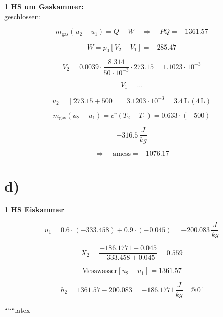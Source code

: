 \textbf{1 HS um Gaskammer:} \\
geschlossen:

\[
m_{\text{gas}} (u_2 - u_1) = Q - W \quad \Rightarrow \quad PQ = -1361.57
\]

\[
W = p_0 \left[ V_2 - V_1 \right] = -285.47
\]

\[
V_2 = 0.0039 \cdot \frac{8.314}{50 \cdot 10^{-3}} \cdot 273.15 = 1.1023 \cdot 10^{-3}
\]

\[
V_1 = \ldots
\]

\[
u_2 = \left[ 273.15 + 500 \right] = 3.1203 \cdot 10^{-3} = 3.4 \, \text{L} \, (4 \, \text{L})
\]

\[
m_{\text{gas}} \left( u_2 - u_1 \right) = c^v \left( T_2 - T_1 \right) = 0.633 \cdot (-500)
\]

\[
-316.5 \, \frac{J}{kg}
\]

\[
\Rightarrow \quad \text{amess} = -1076.17
\]

\section*{d)}

\textbf{1 HS Eiskammer}

\[
u_1 = 0.6 \cdot (-333.458) + 0.9 \cdot (-0.045) = -200.083 \, \frac{J}{kg}
\]

\[
X_2 = \frac{-186.1771 + 0.045}{-333.458 + 0.045} = 0.559
\]

\[
\text{Messwasser} \left[ u_2 - u_1 \right] = 1361.57
\]

\[
h_2 = 1361.57 - 200.083 = -186.1771 \, \frac{J}{kg} \quad @ \, 0^\circ
\]

``````latex


